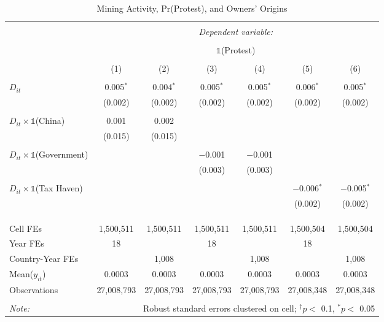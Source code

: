 
\begin{table}[ht!] \centering 
  \caption{Mining Activity, Pr(Protest), and Owners' Origins} 
  \label{tab:did_acled_taxhaven} 
\begin{tabular}{@{\extracolsep{0pt}}lcccccc} 
\\[-1.8ex]\hline 
\hline \\[-1.8ex] 
 & \multicolumn{6}{c}{\textit{Dependent variable:}} \\ 
\cline{2-7} 
\\[-1.8ex] & \multicolumn{2}{c}{} & \multicolumn{2}{c}{$\mathbb{1}$(Protest)} & \multicolumn{2}{c}{} \\ 
\\[-1.8ex] & (1) & (2) & (3) & (4) & (5) & (6)\\ 
\hline \\[-1.8ex] 
 $D_{it}$ & 0.005$^{*}$ & 0.004$^{*}$ & 0.005$^{*}$ & 0.005$^{*}$ & 0.006$^{*}$ & 0.005$^{*}$ \\ 
  & (0.002) & (0.002) & (0.002) & (0.002) & (0.002) & (0.002) \\ 
  & & & & & & \\ 
 $D_{it}\times\mathbb{1}$(China) & 0.001 & 0.002 &  &  &  &  \\ 
  & (0.015) & (0.015) &  &  &  &  \\ 
  & & & & & & \\ 
 $D_{it}\times\mathbb{1}$(Government) &  &  & $-$0.001 & $-$0.001 &  &  \\ 
  &  &  & (0.003) & (0.003) &  &  \\ 
  & & & & & & \\ 
 $D_{it}\times\mathbb{1}$(Tax Haven) &  &  &  &  & $-$0.006$^{*}$ & $-$0.005$^{*}$ \\ 
  &  &  &  &  & (0.002) & (0.002) \\ 
  & & & & & & \\ 
\hline \\[-1.8ex] 
\hline \\[-1.8ex] Cell FEs & 1,500,511 & 1,500,511 & 1,500,511 & 1,500,511 & 1,500,504 & 1,500,504 \\ 
Year FEs & 18 &  & 18 &  & 18 &  \\ 
Country-Year FEs &  & 1,008 &  & 1,008 &  & 1,008 \\ 
Mean($y_{it}$) & 0.0003 & 0.0003 & 0.0003 & 0.0003 & 0.0003 & 0.0003 \\ 
Observations & 27,008,793 & 27,008,793 & 27,008,793 & 27,008,793 & 27,008,348 & 27,008,348 \\ 
\hline 
\hline \\[-1.8ex] 
\textit{Note:}  & \multicolumn{6}{r}{Robust standard errors clustered on cell; $^{\dagger} p <$ 0.1, $^*p <$ 0.05} \\ 
\end{tabular} 
\end{table} 
